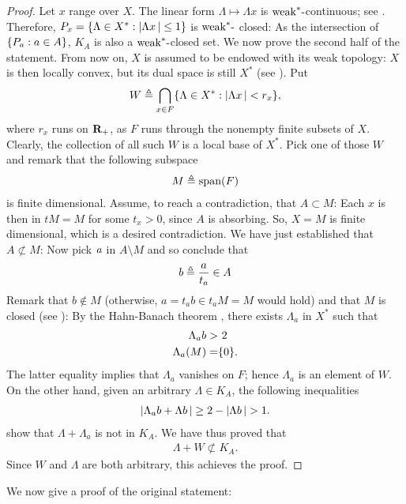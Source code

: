 \begin{proof}%
Let $x$ range over $X$. The linear form %
%
  $\Lambda \mapsto \Lambda x$ %
%
is $\text{weak}^\ast\text{-}$continuous; see . %
Therefore, %
%
  $P_x= \{\Lambda \in X^\ast: \left\lvert \Lambda x \,\right\rvert \leq 1\}$ %
%
is $\text{weak}^\ast\text{-}$ closed: %
As the intersection of $\{P_a: a\in A\}$, %
$K_A$ is also a $\text{weak}^\ast\text{-}$closed set. %
We now prove the second half of the statement. %
%
\newline\newline\noindent
%
From now on, $X$ is assumed to be endowed with its weak topology: %
$X$ is then locally convex, but its dual space is still %
%
  $X^\ast$ (see ). %
%
Put %
%
  \begin{align}
    W \triangleq \bigcap_{x\in F} \{\Lambda \in X^\ast: \left\lvert \Lambda x \,\right\rvert < r_x\}, 
  \end{align}
%
where $r_x$ runs on ${\mathbf R}_+$, %
as $F$ runs through the nonempty finite subsets of $X$. %
%
Clearly, the collection of all such $W$ is a local base of $X^\ast$. %
Pick one of those $W$ and remark that the following subspace %
%
  \begin{align}
    M \triangleq \text{span}(F)
  \end{align}
%
is finite dimensional. %
Assume, to reach a contradiction, that $A\subset M$: %
Each $x$ is then in $tM=M$ for some $t_x>0$, since $A$ is absorbing. %
So, $X=M$ is finite dimensional, which is a desired contradiction.
%
We have just established that $A\not\subset M$: %
Now pick $\mathit{a}$ in $A\setminus M$ and so conclude that %
%
  \begin{align}
    b\triangleq \frac{a}{t_a}\in A
  \end{align}
%
Remark that $b\notin M$ (otherwise, $a = t_a b \in t_a M=M$ would hold) %
and that $M$ is closed (see ): %
By the Hahn-Banach theorem , %
there exists $\Lambda_a$ in $X^\ast$ such that 
%
  \begin{align}
    \label{3.11. Polar_4.}\Lambda_a b    > & \,\,2 \\
    \label{3.11. Polar_4bis.}\Lambda_a (M) = & \{0\}.
  \end{align}
%
The latter equality implies that $\Lambda_a$ vanishes on $F$; %
hence $\Lambda_a$ is an element of $W$. %
On the other hand, given an arbitrary $\Lambda \in K_A$, %
the following inequalities  %
%
  \begin{align}
    \left\lvert \Lambda_a b + \Lambda b \,\right\rvert 
      \geq 
    2 - \left\lvert \Lambda b \,\right\rvert 
      >
    1.
  \end{align}
%
show that $\Lambda + \Lambda_a$ is not in $K_A$. %
%
We have thus proved that
%
  \begin{align}
  \Lambda + W\not\subset K_A.
  \end{align}
%
Since $W$ and $\Lambda$ are both arbitrary, this achieves the proof. %
\end{proof}
%
\noindent
We now give a proof of the original statement:
%
